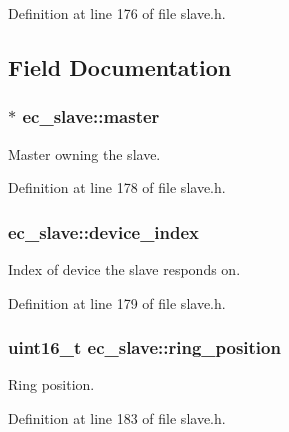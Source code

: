 Definition at line 176 of file slave.\-h.



\subsection{Field Documentation}
\subsubsection[{master}]{$\ast$ ec\-\_\-slave\-::master}\label{structec__slave_ae3ca485627d212610814bf4e0130eddd}


Master owning the slave. 



Definition at line 178 of file slave.\-h.

\subsubsection[{device\-\_\-index}]{ ec\-\_\-slave\-::device\-\_\-index}\label{structec__slave_adc17b41384e235c98b39f4ac49319d68}


Index of device the slave responds on. 



Definition at line 179 of file slave.\-h.

\subsubsection[{ring\-\_\-position}]{\setlength{\rightskip}{0pt plus 5cm}uint16\-\_\-t ec\-\_\-slave\-::ring\-\_\-position}\label{structec__slave_a337a538c53fb9ac8bcfb951fd445e0a1}


Ring position. 



Definition at line 183 of file slave.\-h.

